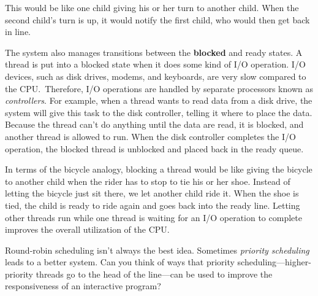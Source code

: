 This would be like one child giving his
or her turn to another child.  When the second child's turn is up, it
would notify the first child, who would then get back in line.

The system also manages transitions between the {\bf blocked} and
ready states.  A thread is put into a blocked state when it does some
kind of I/O operation.  I/O devices, such as disk drives, modems, and
keyboards, are very slow compared to the CPU.~Therefore, I/O
operations are handled by separate processors known as {\it
controllers}. For example, when a thread wants to read data from a
disk drive, the system will give this task to the disk controller,
telling it where to place the data.  Because the thread can't do anything
until the data are read, it is blocked, and another thread is allowed
to run.   When the disk controller completes the I/O operation, the
blocked thread is unblocked and placed back in the ready queue.

In terms of the bicycle analogy, blocking a thread would be like
giving the bicycle to another child when the rider has to stop to tie
his or her shoe.  Instead of letting the bicycle just sit there, we let
another child ride it.  When the shoe is tied, the child is ready to
ride again and goes back into the ready line.  Letting other threads
run while one thread is waiting for an I/O operation to complete
improves the overall utilization of the CPU.

\begin{SSTUDY}

\item  Round-robin scheduling isn't always the best idea.  Sometimes
{\it priority scheduling} leads to a better system.  Can you
think of ways that priority scheduling---higher-priority
threads go to the head of the line---can be used to improve
the responsiveness of an interactive \mbox{program?}
\end{SSTUDY}




